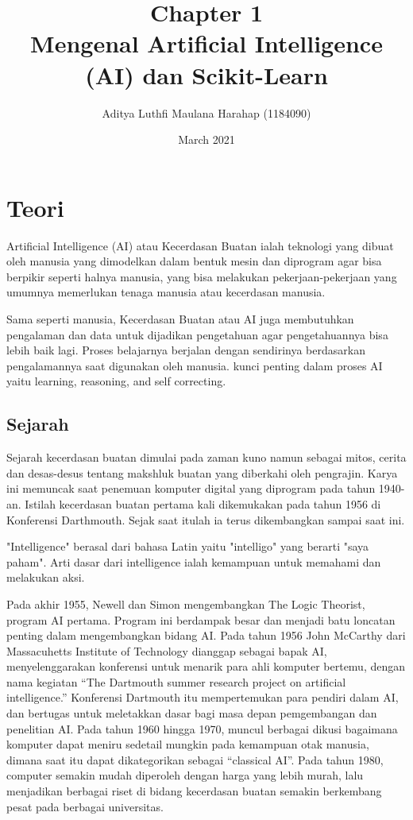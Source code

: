\documentclass{article}
\title{Chapter 1 \\
Mengenal Artificial Intelligence (AI) dan
Scikit-Learn}
\author{Aditya Luthfi Maulana Harahap (1184090)}
\date{March 2021}
\begin{document}
\maketitle 
\section{Teori}
Artificial Intelligence (AI) atau Kecerdasan Buatan ialah teknologi yang dibuat oleh manusia yang dimodelkan dalam bentuk mesin dan diprogram agar bisa berpikir seperti halnya manusia, yang bisa melakukan pekerjaan-pekerjaan yang umumnya memerlukan tenaga manusia atau kecerdasan manusia. 

Sama seperti manusia, Kecerdasan Buatan atau AI juga membutuhkan pengalaman dan data untuk dijadikan pengetahuan agar pengetahuannya bisa lebih baik lagi. Proses belajarnya berjalan dengan sendirinya berdasarkan pengalamannya saat digunakan oleh manusia. kunci penting dalam proses AI yaitu learning, reasoning, and self correcting.

\subsection{Sejarah}
Sejarah kecerdasan buatan dimulai pada zaman kuno namun sebagai mitos, cerita dan desas-desus tentang makshluk buatan yang diberkahi oleh pengrajin. Karya ini memuncak saat penemuan komputer digital yang diprogram pada tahun 1940-an.
Istilah kecerdasan buatan pertama kali dikemukakan pada tahun 1956 di Konferensi Darthmouth. Sejak saat itulah ia terus dikembangkan sampai saat ini.

"Intelligence" berasal dari bahasa Latin yaitu "intelligo" yang berarti "saya paham". Arti dasar dari intelligence ialah kemampuan untuk memahami dan melakukan aksi.

Pada akhir 1955, Newell dan Simon mengembangkan  The Logic Theorist, program AI pertama. Program ini berdampak besar dan menjadi batu loncatan penting dalam mengembangkan bidang AI. Pada tahun 1956 John McCarthy dari  Massacuhetts Institute of Technology dianggap sebagai bapak AI, menyelenggarakan konferensi untuk menarik para ahli komputer bertemu, dengan  nama kegiatan “The Dartmouth summer research project on artificial intelligence.”   Konferensi Dartmouth itu mempertemukan para pendiri dalam AI, dan bertugas untuk meletakkan dasar bagi masa depan  pemgembangan dan penelitian AI. Pada  tahun 1960 hingga 1970, muncul berbagai dikusi bagaimana komputer dapat meniru sedetail mungkin pada kemampuan otak manusia, dimana saat itu dapat dikategorikan sebagai “classical AI”. Pada tahun 1980, computer semakin mudah diperoleh dengan harga yang lebih murah, lalu menjadikan berbagai riset di bidang kecerdasan buatan semakin berkembang pesat pada berbagai universitas.
\end{document}
